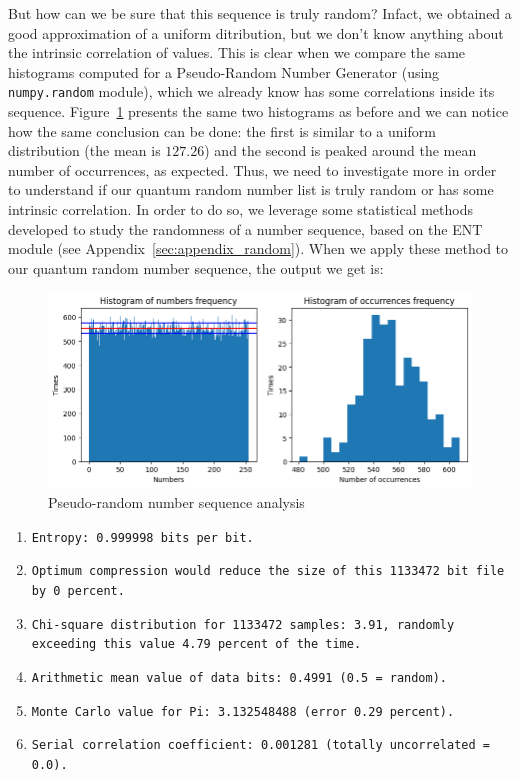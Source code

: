 \documentclass[prl,twocolumn]{revtex4-1}
\begin{document}
But how can we be sure that this sequence is truly random? Infact, we obtained a good approximation of a uniform ditribution, but we don't know anything about the intrinsic correlation of values. This is clear when we compare the same histograms computed for a Pseudo-Random Number Generator (using \texttt{numpy.random} module), which we already know has some correlations inside its sequence. Figure~\ref{fig:prng_stats} presents the same two histograms as before and we can notice how the same conclusion can be done: the first is similar to a uniform distribution (the mean is $127.26$) and the second is peaked around the mean number of occurrences, as expected. Thus, we need to investigate more in order to understand if our quantum random number list is truly random or has some intrinsic correlation. In order to do so, we leverage some statistical methods developed to study the randomness of a
number sequence, based on the ENT module (see Appendix~\ref{sec:appendix_random}). When we apply these method to our quantum random number sequence, the output we get is:
\begin{figure}[!t]
    \centering
    \includegraphics[width=\linewidth]{Images/prng_stats.png}
    \caption{Pseudo-random number sequence analysis}
    \label{fig:prng_stats}
\end{figure}

\begin{enumerate}
    \item \texttt{Entropy: 0.999998 bits per bit.}
    \item \texttt{Optimum compression would reduce the size of this 1133472 bit file by 0 percent.}
    \item \texttt{Chi-square distribution for 1133472 samples: 3.91, randomly exceeding this value 4.79 percent of the time.}
    \item \texttt{Arithmetic mean value of data bits: 0.4991 (0.5 = random).}
    \item \texttt{Monte Carlo value for Pi: 3.132548488 (error 0.29 percent).}
    \item \texttt{Serial correlation coefficient: 0.001281 (totally uncorrelated = 0.0).}
\end{enumerate}
\end{document}
